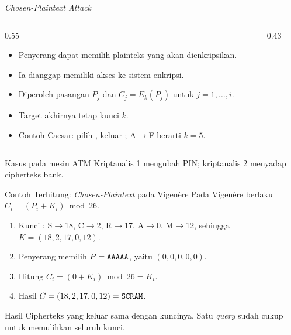 \documentclass[aspectratio=169,11pt]{beamer}
\begin{document}
\begin{frame}{\textit{Chosen-Plaintext Attack}}
    \begin{columns}[T,onlytextwidth]
        \begin{column}{0.55\textwidth}
            \begin{itemize}
                \item Penyerang dapat memilih plainteks yang akan
                      dienkripsikan.
                \item Ia dianggap memiliki akses ke sistem enkripsi.
                \item Diperoleh pasangan $P_j$ dan $C_j=E_k(P_j)$ untuk
                      $j=1,\dots,i$.
                \item Target akhirnya tetap kunci $k$.
                \item Contoh Caesar: pilih , keluar
                      ; A$\to$F berarti $k=5$.
            \end{itemize}
        \end{column}
        \begin{column}{0.43\textwidth}
            \centering
        \end{column}
    \end{columns}
    \vspace{0.05cm}
    \begin{block}{Kasus pada mesin ATM}
        \footnotesize
        Kriptanalis 1 mengubah PIN; kriptanalis 2 menyadap cipherteks bank.
    \end{block}
\end{frame}

\begin{frame}{Contoh Terhitung: \textit{Chosen-Plaintext} pada Vigen\`ere}
    \footnotesize
    Pada Vigen\`ere berlaku $C_i=(P_i+K_i)\bmod 26$.
    \vspace{0.1cm}
    \begin{enumerate}
        \item Kunci : S$\to$18, C$\to$2, R$\to$17, A$\to$0,
              M$\to$12, sehingga $K=(18,2,17,0,12)$.
        \item Penyerang memilih $P=\texttt{AAAAA}$, yaitu
              $(0,0,0,0,0)$.
        \item Hitung $C_i=(0+K_i)\bmod 26=K_i$.
        \item Hasil $C=(18,2,17,0,12)=\texttt{SCRAM}$.
    \end{enumerate}
    \vspace{0.1cm}
    \begin{alertblock}{Hasil}
        Cipherteks yang keluar sama dengan kuncinya. Satu \textit{query} sudah
        cukup untuk memulihkan seluruh kunci.
    \end{alertblock}
\end{frame}
\end{document}
